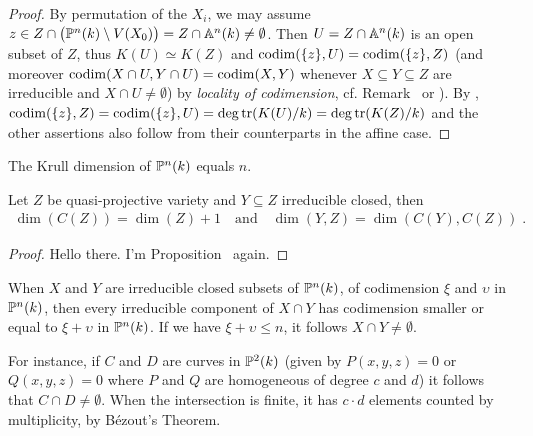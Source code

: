 \documentclass[a4paper,parskip=half,numbers=enddot, DIV=12]{scrreprt}
\begin{document}
\begin{proof}
    By permutation of the $X_i$, we may assume $z\in Z\cap \big(\mathbb{P}^n(k)\setminus V(X_0)\big) = Z\cap \mathbb{A}^n(k)\neq \emptyset$. Then $U=Z\cap \mathbb{A}^n(k)$ is an open subset of $Z$, thus $K(U)\simeq K(Z)$ and $\operatorname{codim}(\{z\},U) = \operatorname{codim}(\{z\},Z)$ (and moreover $\operatorname{codim}(X\cap U, Y\cap U) = \operatorname{codim}(X,Y)$ whenever $X\subseteq Y\subseteq Z$ are irreducible and $X\cap U\neq \emptyset$) by \emph{locality of codimension}, cf. Remark~ or \cite[Remark~2.1.3]{alg1}). By \cite[Theorem~6]{alg1}, $\operatorname{codim} (\{z\},Z) = \operatorname{codim}(\{z\},U) = \deg\operatorname{tr} (K(U)/k) = \deg\operatorname{tr} (K(Z)/k)$ and the other assertions also follow from their counterparts in the affine case.
\end{proof}
\begin{cor}
    The Krull dimension of $\mathbb{P}^n(k)$ equals $n$.
\end{cor}
\begin{prop}
    Let $Z$ be quasi-projective variety and $Y\subseteq Z$ irreducible closed, then 
    \begin{align*}
        \dim(C(Z)) = \dim(Z) +1\quad\text{and}\quad
        \dim(Y,Z) = \dim(C(Y), C(Z))\;.
    \end{align*}
\end{prop}
\begin{proof}
	Hello there. I'm Proposition~ again.
\end{proof}
\begin{thm}
    When $X$ and $Y$ are irreducible closed subsets of $\mathbb{P}^n(k)$, of codimension $\xi$ and $\upsilon$ in $\mathbb{P}^n(k)$, then every irreducible component of $X\cap Y$ has codimension smaller or equal to $\xi +\upsilon$ in $\mathbb{P}^n(k)$. If we have $\xi+\upsilon \leq n$, it follows $X\cap Y \neq \emptyset$.
\end{thm}
\begin{rem*}
    For instance, if $C$ and $D$ are curves in $\mathbb{P}^2(k)$ (given by $P(x,y,z) = 0$ or $Q(x,y,z)= 0$ where $P$ and $Q$ are homogeneous of degree $c$ and $d$) it follows that $C\cap D \neq \emptyset$. When the intersection is finite, it has $c\cdot d$ elements counted by multiplicity, by B\'ezout's Theorem.
\end{rem*}
\end{document}
